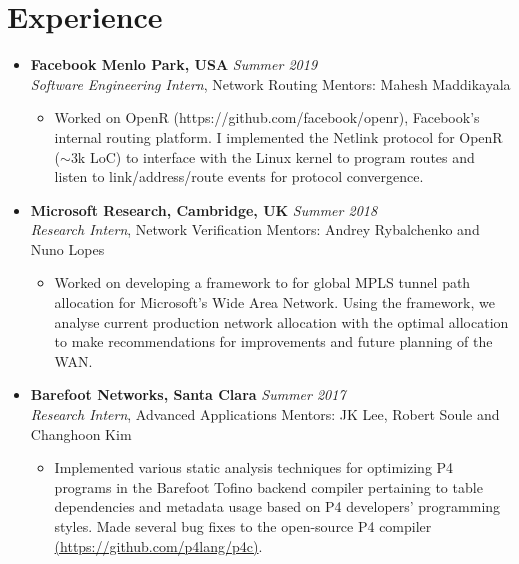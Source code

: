 \documentclass[11pt,a4paper,sans]{moderncv}        %
\begin{document}
\section{Experience}
\begin{itemize}
	\item \textbf{Facebook Menlo Park, USA} \hfill \emph{Summer 2019} \\
	\emph{Software Engineering Intern}, Network Routing \hfill Mentors: Mahesh Maddikayala
	\begin{itemize}
		\item Worked on OpenR (https://github.com/facebook/openr), Facebook's internal routing platform. I implemented the 
		Netlink protocol for OpenR ($\sim$3k LoC) to interface with the Linux kernel to program routes and listen to link/address/route events 
		for protocol convergence.
	\end{itemize}
	\vspace*{6pt}

	\item \textbf{Microsoft Research, Cambridge, UK} \hfill \emph{Summer 2018} \\
	\emph{Research Intern}, Network Verification \hfill Mentors: Andrey Rybalchenko and Nuno Lopes
	\begin{itemize}
		\item Worked on developing a framework to for global MPLS tunnel path allocation for Microsoft's 
		Wide Area Network. Using the framework, we analyse current production network allocation with 
		the optimal allocation to make recommendations for improvements and future planning of the WAN.
	\end{itemize}
	\vspace*{6pt}

	\item \textbf{Barefoot Networks, Santa Clara} \hfill \emph{Summer 2017} \\
	\emph{Research Intern}, Advanced Applications \hfill Mentors: JK Lee, Robert Soule and Changhoon Kim
	\begin{itemize}
		\item Implemented various static analysis techniques for optimizing P4 programs in the Barefoot Tofino backend compiler 
		pertaining to table dependencies and metadata usage based on P4 
		developers' programming styles. Made several
		bug fixes to the open-source P4 compiler \href{https://github.com/p4lang/p4c}{(https://github.com/p4lang/p4c)}.
	\end{itemize}
	\vspace*{6pt}
	

\end{itemize}
\end{document}
